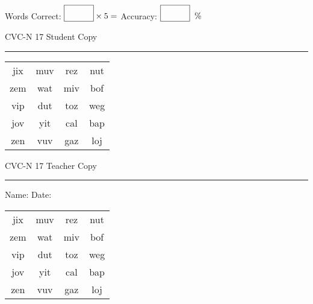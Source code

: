 \documentclass{memoir}
\begin{document}
\small

Words Correct: $\fbox{\phantom{\huge 100}} \times 5 = $ Accuracy: $\fbox{\phantom{\huge 100}}\;\; \%$ 

\vfill

\newpage


\footnotesize \noindent
CVC-N 17 \hfill Student Copy
\smallskip
\hrule

\Large

\setlength{\tabcolsep}{14pt}
\def\arraystretch{2}

{\selectfont


\begin{vplace}[0.5]
\begin{center}
\begin{tabular}{cccc}
jix & muv & rez & nut \\
zem & wat & miv & bof \\
vip & dut & toz & weg \\
jov & yit & cal & bap \\
zen & vuv & gaz & loj \\
\end{tabular}
\end{center}
\end{vplace}

}

\newpage

\footnotesize \noindent
CVC-N 17 \hfill Teacher Copy
\smallskip
\hrule

\small

\vfill

\noindent
Name: \underline{\hspace{1.75in}} \hfill Date: \underline{\hspace{1in}}

\Large

{\selectfont


\begin{vplace}[0.5]
\begin{center}
\begin{tabular}{cccc}
jix & muv & rez & nut \\
zem & wat & miv & bof \\
vip & dut & toz & weg \\
jov & yit & cal & bap \\
zen & vuv & gaz & loj \\
\end{tabular}
\end{center}
\end{vplace}



}
\end{document}
